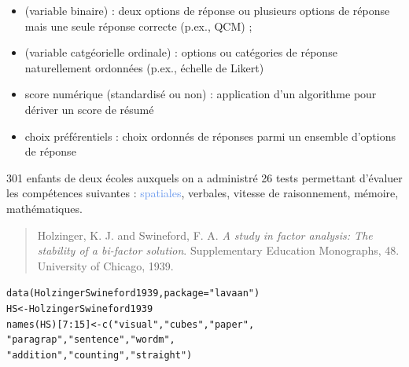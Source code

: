 \begin{itemize}
\item {} (variable binaire) : deux options de réponse
  ou plusieurs options de réponse mais une seule réponse correcte (p.ex., QCM) ;
\item {} (variable catgéorielle ordinale) : options ou
  catégories de réponse naturellement ordonnées (p.ex., échelle de Likert)
\item score numérique (standardisé ou non) : application d'un algorithme pour
  dériver un score de résumé
\item choix préférentiels : choix ordonnés de réponses parmi un ensemble
  d'options de réponse
\end{itemize}


301 enfants de deux écoles auxquels on a administré 26 tests permettant d'évaluer les compétences suivantes : \textcolor{CornflowerBlue}{spatiales}, verbales, vitesse de raisonnement, mémoire, mathématiques.

\begin{quote}
  Holzinger, K. J. and Swineford, F. A. \emph{A study in factor analysis: The stability
  of a bi-factor solution}. Supplementary Education Monographs, 48. University of
  Chicago, 1939.  
\end{quote}


{\centering {}\par}



\begin{alltt}
data(HolzingerSwineford1939, package="lavaan") 
HS <- HolzingerSwineford1939
names(HS)[7:15] <- c("\textcolor{Apricot}{visual}", "\textcolor{Apricot}{cubes}", "\textcolor{Apricot}{paper}", \hfill\textcolor{CornflowerBlue}{}
                     "paragrap", "sentence", "wordm", \hfill{}
                     "addition", "counting", "straight") \hfill{}
\end{alltt}

